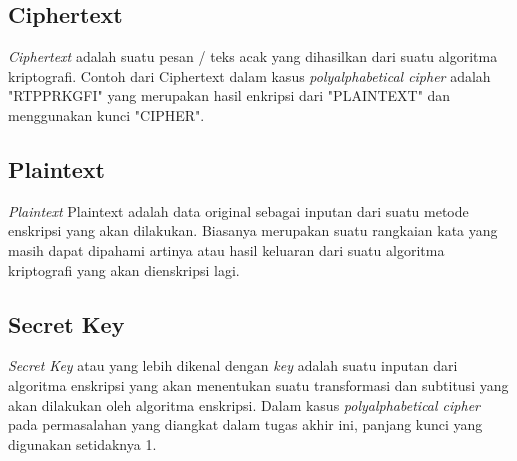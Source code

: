 	\subsection{Ciphertext}
	\textit{Ciphertext} adalah suatu pesan / teks acak yang dihasilkan dari suatu algoritma kriptografi. 
	Contoh dari Ciphertext dalam kasus \textit{polyalphabetical cipher} adalah "RTPPRKGFI" yang merupakan hasil enkripsi dari "PLAINTEXT" dan menggunakan kunci "CIPHER".\cite{william_crytography_2011}
	
	\subsection{Plaintext}
	\textit{Plaintext} Plaintext adalah data original sebagai inputan dari suatu metode enskripsi yang akan dilakukan\cite{william_crytography_2011}. Biasanya merupakan suatu rangkaian kata yang masih dapat dipahami artinya atau hasil keluaran dari suatu algoritma kriptografi yang akan dienskripsi lagi.
	
	\subsection{Secret Key}
	\textit{Secret Key} atau yang lebih dikenal dengan \textit{key} adalah suatu inputan dari algoritma enskripsi yang akan menentukan suatu transformasi dan subtitusi yang akan dilakukan oleh algoritma enskripsi\cite{william_crytography_2011}. Dalam kasus \textit{polyalphabetical cipher} pada permasalahan yang diangkat dalam tugas akhir ini, panjang kunci yang digunakan setidaknya 1. 
	
